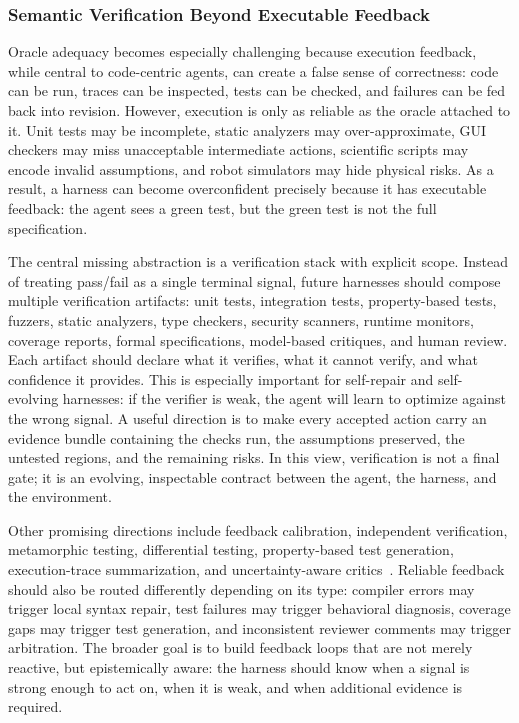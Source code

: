 \documentclass{llmxive}
\begin{document}
\subsubsection{Semantic Verification Beyond Executable Feedback}

Oracle adequacy becomes especially challenging because execution feedback, while central to code-centric agents, can create a false sense of correctness: code can be run, traces can be inspected, tests can be checked, and failures can be fed back into revision. However, execution is only as reliable as the oracle attached to it. Unit tests may be incomplete, static analyzers may over-approximate, GUI checkers may miss unacceptable intermediate actions, scientific scripts may encode invalid assumptions, and robot simulators may hide physical risks. As a result, a harness can become overconfident precisely because it has executable feedback: the agent sees a green test, but the green test is not the full specification.

The central missing abstraction is a verification stack with explicit scope. Instead of treating pass/fail as a single terminal signal, future harnesses should compose multiple verification artifacts: unit tests, integration tests, property-based tests, fuzzers, static analyzers, type checkers, security scanners, runtime monitors, coverage reports, formal specifications, model-based critiques, and human review. Each artifact should declare what it verifies, what it cannot verify, and what confidence it provides. This is especially important for self-repair and self-evolving harnesses: if the verifier is weak, the agent will learn to optimize against the wrong signal. A useful direction is to make every accepted action carry an evidence bundle containing the checks run, the assumptions preserved, the untested regions, and the remaining risks. In this view, verification is not a final gate; it is an evolving, inspectable contract between the agent, the harness, and the environment.

Other promising directions include feedback calibration, independent verification, metamorphic testing, differential testing, property-based test generation, execution-trace summarization, and uncertainty-aware critics~\citep{ni2023lever,jung-etal-2025-code,tang2026execverify}. Reliable feedback should also be routed differently depending on its type: compiler errors may trigger local syntax repair, test failures may trigger behavioral diagnosis, coverage gaps may trigger test generation, and inconsistent reviewer comments may trigger arbitration. The broader goal is to build feedback loops that are not merely reactive, but epistemically aware: the harness should know when a signal is strong enough to act on, when it is weak, and when additional evidence is required.
\end{document}
